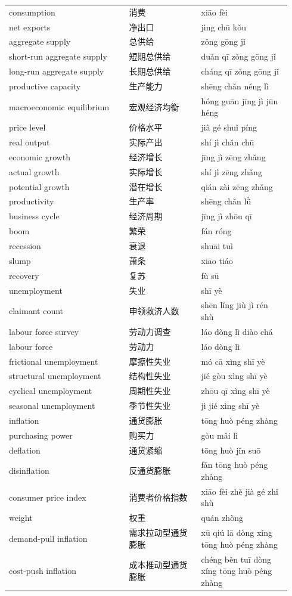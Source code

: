 \documentclass[11pt]{article}
\begin{document}
\begin{longtable}{@{}p{0.40\linewidth}p{0.24\linewidth}p{0.30\linewidth}@{}}
consumption & 消费 & xiāo fèi \\
net exports & 净出口 & jìng chū kǒu \\
aggregate supply & 总供给 & zǒng gōng jǐ \\
short-run aggregate supply & 短期总供给 & duǎn qī zǒng gōng jǐ \\
long-run aggregate supply & 长期总供给 & cháng qī zǒng gōng jǐ \\
productive capacity & 生产能力 & shēng chǎn néng lì \\
macroeconomic equilibrium & 宏观经济均衡 & hóng guān jīng jì jūn héng \\
price level & 价格水平 & jià gé shuǐ píng \\
real output & 实际产出 & shí jì chǎn chū \\
economic growth & 经济增长 & jīng jì zēng zhǎng \\
actual growth & 实际增长 & shí jì zēng zhǎng \\
potential growth & 潜在增长 & qián zài zēng zhǎng \\
productivity & 生产率 & shēng chǎn lǜ \\
business cycle & 经济周期 & jīng jì zhōu qī \\
boom & 繁荣 & fán róng \\
recession & 衰退 & shuāi tuì \\
slump & 萧条 & xiāo tiáo \\
recovery & 复苏 & fù sū \\
unemployment & 失业 & shī yè \\
claimant count & 申领救济人数 & shēn lǐng jiù jì rén shù \\
labour force survey & 劳动力调查 & láo dòng lì diào chá \\
labour force & 劳动力 & láo dòng lì \\
frictional unemployment & 摩擦性失业 & mó cā xìng shī yè \\
structural unemployment & 结构性失业 & jié gòu xìng shī yè \\
cyclical unemployment & 周期性失业 & zhōu qī xìng shī yè \\
seasonal unemployment & 季节性失业 & jì jié xìng shī yè \\
inflation & 通货膨胀 & tōng huò péng zhàng \\
purchasing power & 购买力 & gòu mǎi lì \\
deflation & 通货紧缩 & tōng huò jǐn suō \\
disinflation & 反通货膨胀 & fǎn tōng huò péng zhàng \\
consumer price index & 消费者价格指数 & xiāo fèi zhě jià gé zhǐ shù \\
weight & 权重 & quán zhòng \\
demand-pull inflation & 需求拉动型通货膨胀 & xū qiú lā dòng xíng tōng huò péng zhàng \\
cost-push inflation & 成本推动型通货膨胀 & chéng běn tuī dòng xíng tōng huò péng zhàng \\
\end{longtable}
\end{document}

